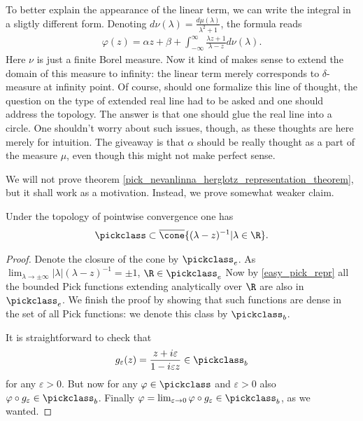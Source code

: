 To better explain the appearance of the linear term, we can write the integral in a sligtly different form. Denoting $d \nu(\lambda) = \frac{d \mu(\lambda)}{\lambda^2 + 1}$, the formula reads
\begin{align*}
	\varphi(z) = \alpha z + \beta + \int_{-\infty}^{\infty} \frac{\lambda z + 1}{\lambda - z} d \nu(\lambda).
\end{align*}
Here $\nu$ is just a finite Borel measure. Now it kind of makes sense to extend the domain of this measure to infinity: the linear term merely corresponds to $\delta$-measure at infinity point. Of course, should one formalize this line of thought, the question on the type of extended real line had to be asked and one should address the topology. The answer is that one should glue the real line into a circle. One shouldn't worry about such issues, though, as these thoughts are here merely for intuition. The giveaway is that $\alpha$ should be really thought as a part of the measure $\mu$, even though this might not make perfect sense.

We will not prove theorem \ref{pick_nevanlinna_herglotz_representation_theorem}, but it shall work as a motivation. Instead, we prove somewhat weaker claim.
\begin{lem}\label{pick_dense}
	Under the topology of pointwise convergence one has
	\begin{align*}
		\pickclass \subset \overline{\cone}\{(\lambda - z)^{-1} | \lambda \in \R\}.
	\end{align*}
\end{lem}
\begin{proof}
	Denote the closure of the cone by $\pickclass_{e}$. As $\lim_{\lambda \to \pm \infty}|\lambda|(\lambda - z)^{-1} = \pm 1$, $\R \in \pickclass_{e}$ Now by \ref{easy_pick_repr} all the bounded Pick functions extending analytically over $\R$ are also in $\pickclass_{e}$. We finish the proof by showing that such functions are dense in the set of all Pick functions: we denote this class by $\pickclass_{b}$.

	It is straightforward to check that
	\begin{align*}
		g_{\varepsilon}(z) = \frac{z + i \varepsilon}{1 - i \varepsilon z} \in \pickclass_{b}
	\end{align*}
	for any $\varepsilon > 0$. But now for any $\varphi \in \pickclass$ and $\varepsilon > 0$ also $\varphi \circ g_{\varepsilon} \in \pickclass_{b}$. Finally $\varphi = \lim_{\varepsilon \to 0} \varphi \circ g_{\varepsilon} \in \pickclass_{b}$, as we wanted.
\end{proof}

